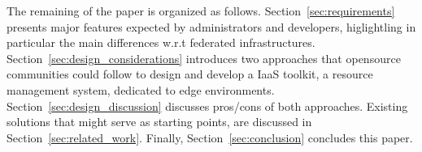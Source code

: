 The remaining of the paper is organized as
follows. Section~\ref{sec:requirements} presents major features expected by administrators and developers, higlightling in particular the main differences
w.r.t federated infrastructures.
Section~\ref{sec:design_considerations} introduces two approaches
that opensource communities could follow to design and develop a IaaS
toolkit, \aka a resource management system, dedicated to edge
environments. Section~\ref{sec:design_discussion} discusses pros/cons
of both approaches. Existing solutions that might serve as
starting points, are discussed in
Section~\ref{sec:related_work}. Finally, Section~\ref{sec:conclusion} concludes this paper.



